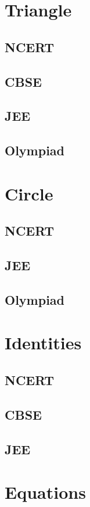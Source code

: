 \documentclass[journal]{IEEEtran}
\begin{document}
\section{Triangle}
\subsection{NCERT}

\subsection{CBSE}

\subsection{JEE}
 
\subsection{Olympiad}

\section{Circle}
\subsection{NCERT}

\subsection{JEE}

\subsection{Olympiad}

%
\section{Identities}
\subsection{NCERT}
 
\subsection{CBSE}
 
\subsection{JEE}
 
\section{Equations}
\end{document}
